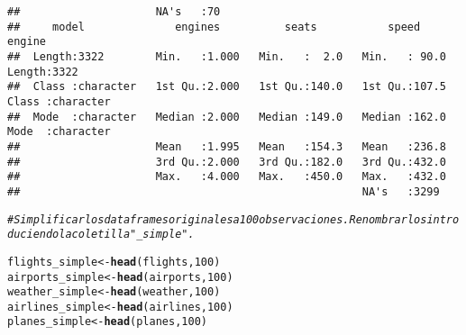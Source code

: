 \documentclass{article}\usepackage[]{graphicx}\usepackage[]{xcolor}
\makeatletter
\newcommand{\hlnum}[1]{\textcolor[rgb]{0.686,0.059,0.569}{#1}}%
\newcommand{\hlcom}[1]{\textcolor[rgb]{0.678,0.584,0.686}{\textit{#1}}}%
\newcommand{\hlstd}[1]{\textcolor[rgb]{0.345,0.345,0.345}{#1}}%
\newcommand{\hlkwb}[1]{\textcolor[rgb]{0.69,0.353,0.396}{#1}}%
\newcommand{\hlkwd}[1]{\textcolor[rgb]{0.737,0.353,0.396}{\textbf{#1}}}%
\newenvironment{kframe}{%
 \def\at@end@of@kframe{}%
 \ifinner\ifhmode%
  \def\at@end@of@kframe{\end{minipage}}%
  \begin{minipage}{\columnwidth}%
 \fi\fi%
 \def\FrameCommand##1{\hskip\@totalleftmargin \hskip-\fboxsep
 \colorbox{shadecolor}{##1}\hskip-\fboxsep
     \hskip-\linewidth \hskip-\@totalleftmargin \hskip\columnwidth}%
 \MakeFramed {\advance\hsize-\width
   \@totalleftmargin\z@ \linewidth\hsize
   \@setminipage}}%
 {\par\unskip\endMakeFramed%
 \at@end@of@kframe}
\newenvironment{knitrout}{}{} %
\makeatother
\begin{document}
\begin{knitrout}
\begin{kframe}
\begin{verbatim}
##                     NA's   :70                                          
##     model              engines          seats           speed          engine         
##  Length:3322        Min.   :1.000   Min.   :  2.0   Min.   : 90.0   Length:3322       
##  Class :character   1st Qu.:2.000   1st Qu.:140.0   1st Qu.:107.5   Class :character  
##  Mode  :character   Median :2.000   Median :149.0   Median :162.0   Mode  :character  
##                     Mean   :1.995   Mean   :154.3   Mean   :236.8                     
##                     3rd Qu.:2.000   3rd Qu.:182.0   3rd Qu.:432.0                     
##                     Max.   :4.000   Max.   :450.0   Max.   :432.0                     
##                                                     NA's   :3299
\end{verbatim}
\begin{alltt}
\hlcom{# Simplificar los dataframes originales a 100 observaciones. Renombrarlos introduciendo la coletilla "_simple".}

\hlstd{flights_simple} \hlkwb{<-} \hlkwd{head}\hlstd{(flights,}\hlnum{100}\hlstd{)}
\hlstd{airports_simple} \hlkwb{<-} \hlkwd{head}\hlstd{(airports,}\hlnum{100}\hlstd{)}
\hlstd{weather_simple} \hlkwb{<-} \hlkwd{head}\hlstd{(weather,}\hlnum{100}\hlstd{)}
\hlstd{airlines_simple} \hlkwb{<-} \hlkwd{head}\hlstd{(airlines,}\hlnum{100}\hlstd{)}
\hlstd{planes_simple} \hlkwb{<-} \hlkwd{head}\hlstd{(planes,}\hlnum{100}\hlstd{)}



\end{alltt}
\end{kframe}
\end{knitrout}
\end{document}

